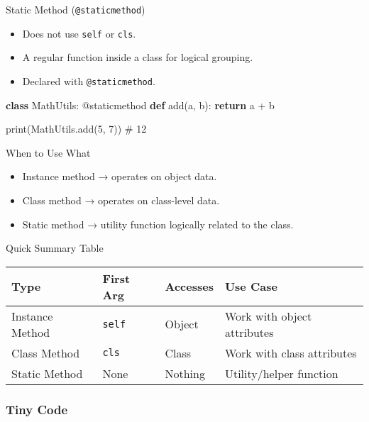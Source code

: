 \documentclass[
  letterpaper,
  DIV=11,
  numbers=noendperiod]{scrreprt}
\newenvironment{Shaded}{\begin{snugshade}}{\end{snugshade}}
\newcommand{\AttributeTok}[1]{\textcolor[rgb]{0.40,0.45,0.13}{#1}}
\newcommand{\BuiltInTok}[1]{\textcolor[rgb]{0.00,0.23,0.31}{#1}}
\newcommand{\CommentTok}[1]{\textcolor[rgb]{0.37,0.37,0.37}{#1}}
\newcommand{\ControlFlowTok}[1]{\textcolor[rgb]{0.00,0.23,0.31}{\textbf{#1}}}
\newcommand{\DecValTok}[1]{\textcolor[rgb]{0.68,0.00,0.00}{#1}}
\newcommand{\KeywordTok}[1]{\textcolor[rgb]{0.00,0.23,0.31}{\textbf{#1}}}
\newcommand{\NormalTok}[1]{\textcolor[rgb]{0.00,0.23,0.31}{#1}}
\newcommand{\OperatorTok}[1]{\textcolor[rgb]{0.37,0.37,0.37}{#1}}
\providecommand{\tightlist}{%
  \setlength{\itemsep}{0pt}\setlength{\parskip}{0pt}}
\begin{document}
Static Method (\texttt{@staticmethod})

\begin{itemize}
\tightlist
\item
  Does not use \texttt{self} or \texttt{cls}.
\item
  A regular function inside a class for logical grouping.
\item
  Declared with \texttt{@staticmethod}.
\end{itemize}

\begin{Shaded}
\begin{Highlighting}[]
\KeywordTok{class}\NormalTok{ MathUtils:}
    \AttributeTok{@staticmethod}
    \KeywordTok{def}\NormalTok{ add(a, b):}
        \ControlFlowTok{return}\NormalTok{ a }\OperatorTok{+}\NormalTok{ b}

\BuiltInTok{print}\NormalTok{(MathUtils.add(}\DecValTok{5}\NormalTok{, }\DecValTok{7}\NormalTok{))   }\CommentTok{\# 12}
\end{Highlighting}
\end{Shaded}

When to Use What

\begin{itemize}
\tightlist
\item
  Instance method → operates on object data.
\item
  Class method → operates on class-level data.
\item
  Static method → utility function logically related to the class.
\end{itemize}

Quick Summary Table

\begin{longtable}[]{@{}llll@{}}
\toprule\noalign{}
Type & First Arg & Accesses & Use Case \\
\midrule\noalign{}
\endhead
\bottomrule\noalign{}
\endlastfoot
Instance Method & \texttt{self} & Object & Work with object
attributes \\
Class Method & \texttt{cls} & Class & Work with class attributes \\
Static Method & None & Nothing & Utility/helper function \\
\end{longtable}

\subsubsection{Tiny Code}\label{tiny-code-69}
\end{document}
